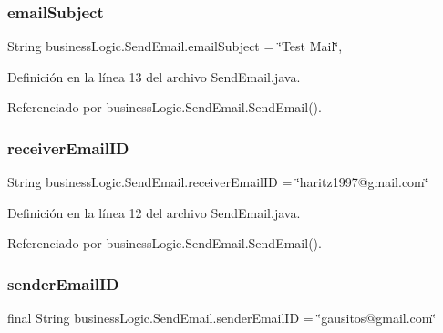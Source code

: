 \subsubsection{\texorpdfstring{emailSubject}{emailSubject}}
{\footnotesize\ttfamily String business\+Logic.\+Send\+Email.\+email\+Subject = \char`\"{}Test Mail\char`\"{}\hspace{0.3cm}{\ttfamily [static]}, {\ttfamily [package]}}



Definición en la línea 13 del archivo Send\+Email.\+java.



Referenciado por business\+Logic.\+Send\+Email.\+Send\+Email().

\mbox{\label{classbusiness_logic_1_1_send_email_ac77f915d22477cea3ca986da4acffbbc}} 
\subsubsection{\texorpdfstring{receiverEmailID}{receiverEmailID}}
{\footnotesize\ttfamily String business\+Logic.\+Send\+Email.\+receiver\+Email\+ID = \char`\"{}haritz1997@gmail.\+com\char`\"{}\hspace{0.3cm}{\ttfamily [package]}}



Definición en la línea 12 del archivo Send\+Email.\+java.



Referenciado por business\+Logic.\+Send\+Email.\+Send\+Email().

\mbox{\label{classbusiness_logic_1_1_send_email_a2e47b8c2228b215b8335c16ba592b95d}} 
\subsubsection{\texorpdfstring{senderEmailID}{senderEmailID}}
{\footnotesize\ttfamily final String business\+Logic.\+Send\+Email.\+sender\+Email\+ID = \char`\"{}gausitos@gmail.\+com\char`\"{}\hspace{0.3cm}{\ttfamily [package]}}



